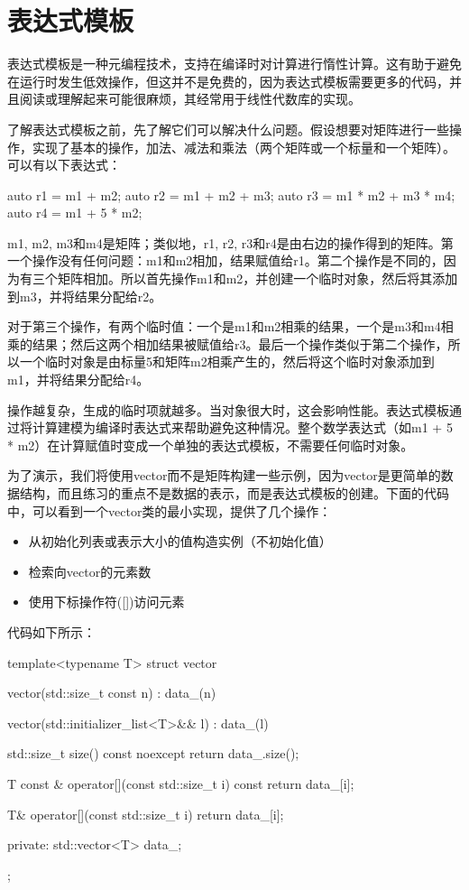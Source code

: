 \section{表达式模板}

表达式模板是一种元编程技术，支持在编译时对计算进行惰性计算。这有助于避免在运行时发生低效操作，但这并不是免费的，因为表达式模板需要更多的代码，并且阅读或理解起来可能很麻烦，其经常用于线性代数库的实现。

了解表达式模板之前，先了解它们可以解决什么问题。假设想要对矩阵进行一些操作，实现了基本的操作，加法、减法和乘法（两个矩阵或一个标量和一个矩阵）。可以有以下表达式：

\begin{cppcode}
auto r1 = m1 + m2;
auto r2 = m1 + m2 + m3;
auto r3 = m1 * m2 + m3 * m4;
auto r4 = m1 + 5 * m2;
\end{cppcode}

m1, m2, m3和m4是矩阵；类似地，r1, r2, r3和r4是由右边的操作得到的矩阵。第一个操作没有任何问题：m1和m2相加，结果赋值给r1。第二个操作是不同的，因为有三个矩阵相加。所以首先操作m1和m2，并创建一个临时对象，然后将其添加到m3，并将结果分配给r2。

对于第三个操作，有两个临时值：一个是m1和m2相乘的结果，一个是m3和m4相乘的结果；然后这两个相加结果被赋值给r3。最后一个操作类似于第二个操作，所以一个临时对象是由标量5和矩阵m2相乘产生的，然后将这个临时对象添加到m1，并将结果分配给r4。

操作越复杂，生成的临时项就越多。当对象很大时，这会影响性能。表达式模板通过将计算建模为编译时表达式来帮助避免这种情况。整个数学表达式（如m1 + 5 * m2）在计算赋值时变成一个单独的表达式模板，不需要任何临时对象。

为了演示，我们将使用vector而不是矩阵构建一些示例，因为vector是更简单的数据结构，而且练习的重点不是数据的表示，而是表达式模板的创建。下面的代码中，可以看到一个vector类的最小实现，提供了几个操作：

\begin{itemize}
  \item 从初始化列表或表示大小的值构造实例（不初始化值）
  \item 检索向vector的元素数
  \item 使用下标操作符([])访问元素
\end{itemize}

代码如下所示：

\begin{cppcode}
template<typename T>
struct vector
{
	vector(std::size_t const n) : data_(n) {}
	
	vector(std::initializer_list<T>&& l) : data_(l) {}
	
	std::size_t size() const noexcept
	{
		return data_.size();
	}

	T const & operator[](const std::size_t i) const
	{
		return data_[i];
	}

	T& operator[](const std::size_t i)
	{
		return data_[i];
	}

private:
	std::vector<T> data_;
};
\end{cppcode}


